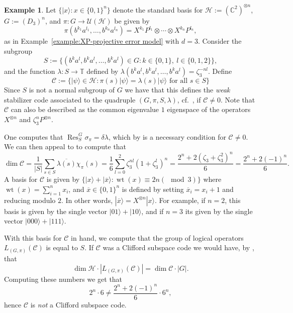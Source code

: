 \documentclass[11pt]{article}
\theoremstyle{definition}
\newtheorem{example}{Example}
\def\ket#1{| #1 \rangle}
\newcommand{\bbC}{\mathbb{C}}
\newcommand{\bbT}{\mathbb{T}}
\newcommand{\calC}{\mathcal{C}}
\newcommand{\calH}{\mathcal{H}}
\newcommand{\calU}{\mathcal{U}}
\newcommand{\Res}{\operatorname{Res}}
\DeclareMathOperator{\wt}{wt}
\begin{document}
\begin{example}\label{example: negative XP result}
    Let $\{\ket{x} : x \in \{0,1\}^n\}$ denote the standard basis for $\calH := (\bbC^2)^{\otimes n}$, $G := (D_3)^n$, and $\pi \colon G \to \calU(\calH)$ be given by
    \[
        \pi(b^{k_1}a^{l_1},\ldots,b^{k_n}a^{l_n}) = X^{k_1}P^{l_1} \otimes \cdots \otimes X^{k_n}P^{l_n},
    \]
    as in Example~\ref{example:XP-projective error model} with $d = 3$. Consider the subgroup
    \[
        S := \{ (b^ka^l,b^ka^l,\ldots,b^ka^l) \in G : k \in \{0,1\}, \ l \in \{0,1,2\}\},
    \]
    and the function $\lambda \colon S \to \bbT$ defined by $\lambda(b^ka^l,b^ka^l,\ldots,b^ka^l) = \zeta_3^{-nl}$. Define
    \[
        \calC := \{ \ket{\psi} \in \calH : \pi(s)\ket{\psi} = \lambda(s)\ket{\psi} \text{ for all } s \in S \}
    \]
    Since $S$ is not a normal subgroup of $G$ we have that this defines the \emph{weak} stabilizer code associated to the quadruple $(G,\pi,S,\lambda)$, cf.~\cite[Definition 5.2]{Eidesen2025}, if $\calC \neq 0$. Note that $\calC$ can also be described as the common eigenvalue $1$ eigenspace of the operators $X^{\otimes n}$ and $\zeta_3^n P^{\otimes n}$.

    One computes that $\Res^G_S\sigma_\pi = \delta \lambda$, which by \cite[Theorem 5.5]{Eidesen2025} is a necessary condition for $\calC \neq 0$. We can then appeal to \cite[Proposition 5.7]{Eidesen2025} to compute that
    \[
        \dim\calC
        = \frac{1}{|S|} \sum_{s \in S} \overline{\lambda(s)}\chi_\pi(s)
        = \frac{1}{6} \sum_{l = 0}^{2} \zeta_3^{nl}(1 + \zeta_3^l)^n
        = \frac{2^n + 2(\zeta_3 + \zeta_3^2)^n}{6} 
        = \frac{2^n + 2(-1)^n}{6}.
    \]
    A basis for $\calC$ is given by $\{ \ket{x} + \ket{\overline{x}} : \wt(x) \equiv 2n (\!\!\!\mod 3) \}$ where $\wt(x) = \sum_{i = 1}^{n} x_i$, and $\overline{x} \in \{0,1\}^n$ is defined by setting $\overline{x}_i = x_i + 1$ and reducing modulo $2$. In other words, $\ket{\overline{x}} = X^{\otimes n} \ket{x}$. For example, if $n = 2$, this basis is given by the single vector $\ket{01} + \ket{10}$, and if $n = 3$ its given by the single vector $\ket{000} + \ket{111}$.
    
    With this basis for $\calC$ in hand, we compute that the group of logical operators $L_{(G,\pi)}(\calC)$ is equal to $S$. If $\calC$ was a Clifford subspace code we would have, by \cite[Corollary 6.5]{Eidesen2025}, that
    \[
        \dim\calH \cdot |L_{(G,\pi)}(\calC)| = \dim\calC \cdot |G|.
    \]
    Computing these numbers we get that
    \[
        2^n \cdot 6 \neq \frac{2^n + 2(-1)^n}{6} \cdot 6^n,
    \]
    hence $\calC$ is \emph{not} a Clifford subspace code.
    

\end{example}
\end{document}
